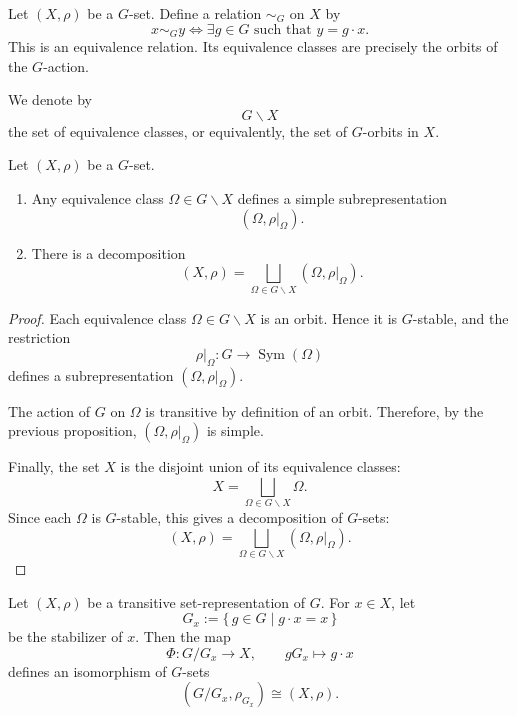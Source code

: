Let \((X,\rho)\) be a \(G\)-set. Define a relation \(\sim_G\) on \(X\) by
\[
    x\sim_G y
    \iff
    \exists g\in G \text{ such that } y=g\cdot x.
\]
This is an equivalence relation. Its equivalence classes are precisely the orbits of
the \(G\)-action.

We denote by
\[
    G\backslash X
\]
the set of equivalence classes, or equivalently, the set of \(G\)-orbits in \(X\).

\begin{proposition}
    Let \((X,\rho)\) be a \(G\)-set.
    \begin{enumerate}
        \item Any equivalence class \(\Omega\in G\backslash X\) defines a simple
        subrepresentation
        \[
            (\Omega,\rho|_{\Omega}).
        \]

        \item There is a decomposition
        \[
            (X,\rho)
            =
            \bigsqcup_{\Omega\in G\backslash X}
            (\Omega,\rho|_{\Omega}).
        \]
    \end{enumerate}
\end{proposition}

\begin{proof}
    Each equivalence class \(\Omega\in G\backslash X\) is an orbit. Hence it is
    \(G\)-stable, and the restriction
    \[
        \rho|_{\Omega}:G\longrightarrow \operatorname{Sym}(\Omega)
    \]
    defines a subrepresentation \((\Omega,\rho|_{\Omega})\).

    The action of \(G\) on \(\Omega\) is transitive by definition of an orbit.
    Therefore, by the previous proposition, \((\Omega,\rho|_{\Omega})\) is simple.

    Finally, the set \(X\) is the disjoint union of its equivalence classes:
    \[
        X=\bigsqcup_{\Omega\in G\backslash X}\Omega.
    \]
    Since each \(\Omega\) is \(G\)-stable, this gives a decomposition of
    \(G\)-sets:
    \[
        (X,\rho)
        =
        \bigsqcup_{\Omega\in G\backslash X}
        (\Omega,\rho|_{\Omega}).
    \]
\end{proof}

\begin{theorem}
    Let \((X,\rho)\) be a transitive set-representation of \(G\). For \(x\in X\),
    let
    \[
        G_x:=\{\,g\in G\mid g\cdot x=x\,\}
    \]
    be the stabilizer of \(x\). Then the map
    \[
        \Phi:G/G_x\longrightarrow X,
        \qquad
        gG_x\longmapsto g\cdot x
    \]
    defines an isomorphism of \(G\)-sets
    \[
        (G/G_x,\rho_{G_x})
        \cong
        (X,\rho).
    \]
\end{theorem}

